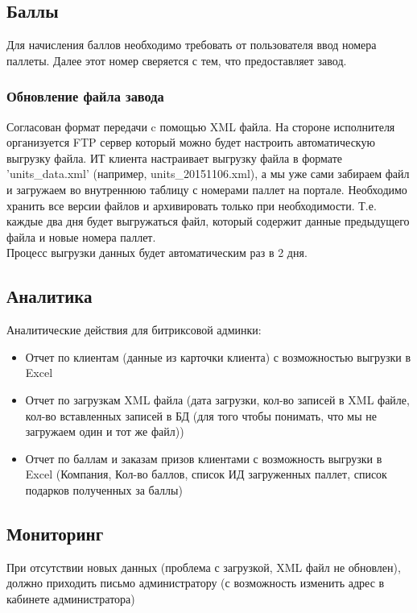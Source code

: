 \documentclass[DIV=calc, paper=a4, fontsize=11pt]{scrartcl} %
\begin{document}
\subsection{Баллы}

Для начисления баллов необходимо требовать от пользователя ввод номера паллеты. Далее этот номер сверяется с тем, что предоставляет завод.

\subsubsection{Обновление файла завода}

Согласован формат передачи c помощью XML файла. На стороне исполнителя организуется FTP сервер который можно будет настроить автоматическую выгрузку файла. ИТ клиента настраивает выгрузку файла в формате 'units\_data.xml' (например, units\_20151106.xml), а мы уже сами забираем файл и загружаем во внутреннюю таблицу с номерами паллет на портале. Необходимо хранить все версии файлов и архивировать только при необходимости. Т.е. каждые два дня будет выгружаться файл, который содержит данные предыдущего файла и новые номера паллет.
\\[0.5cm]
Процесс выгрузки данных будет автоматическим раз в 2 дня.

\subsection{Аналитика}

Аналитические действия для битриксовой админки:

\begin{itemize}
	\item Отчет по клиентам (данные из карточки клиента) с возможностью выгрузки в Excel
	\item Отчет по загрузкам XML файла (дата загрузки, кол-во записей в XML файле, кол-во вставленных записей в БД (для того чтобы понимать, что мы не загружаем один и тот же файл))
	\item Отчет по баллам и заказам призов клиентами с возможность выгрузки в Excel (Компания, Кол-во баллов, список ИД  загруженных паллет, список подарков полученных за баллы)

\end{itemize}

\subsection{Мониторинг}
При отсутствии новых данных (проблема с загрузкой, XML файл не обновлен), должно приходить письмо администратору (с возможность изменить адрес в кабинете администратора)
\end{document}
